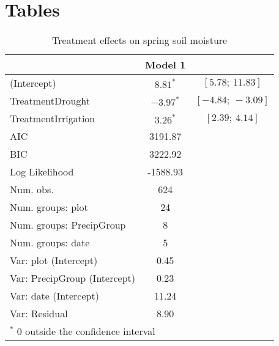 \documentclass[11pt]{article}
\begin{document}
\clearpage
\newpage

\section*{Tables}

\begin{table}[h]
	\caption{Treatment effects on spring soil moisture}
	\centering
	\begin{tabular}{l c c }
		\hline
		& Model 1 \\
		\hline
		(Intercept)                  & $8.81^{*}$    	& $[5.78;\ 11.83]$  \\
		TreatmentDrought             & $-3.97^{*}$      & $[-4.84;\ -3.09]$ \\
		TreatmentIrrigation          & $3.26^{*}$       & $[2.39;\ 4.14]$   \\
		\hline
		AIC                          & 3191.87           \\
		BIC                          & 3222.92           \\
		Log Likelihood               & -1588.93          \\
		Num. obs.                    & 624               \\
		Num. groups: plot            & 24                \\
		Num. groups: PrecipGroup     & 8                 \\
		Num. groups: date            & 5                 \\
		Var: plot (Intercept)        & 0.45              \\
		Var: PrecipGroup (Intercept) & 0.23              \\
		Var: date (Intercept)        & 11.24             \\
		Var: Residual                & 8.90              \\
		\hline
		\multicolumn{2}{l}{\scriptsize{$^*$ 0 outside the confidence interval}}
	\end{tabular}
	\label{table:spotVWC}
\end{table}
\end{document}
